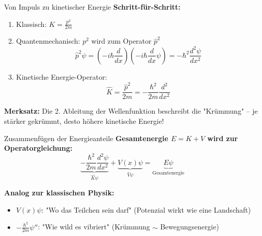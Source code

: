 \documentclass{beamer}
\begin{document}
    \begin{frame}{Von Impuls zu kinetischer Energie}
        \textbf{Schritt-für-Schritt:}
        \begin{enumerate}
            \item Klassisch: $K = \frac{p^2}{2m}$
            \item Quantenmechanisch: $p^2$ wird zum Operator $\hat{p}^2$
            \[
                \hat{p}^2\psi = (-i\hbar \frac{d}{dx})(-i\hbar \frac{d}{dx}\psi) = -\hbar^2 \frac{d^2\psi}{dx^2}
            \]
            \item Kinetische Energie-Operator:
            \[
                \hat{K} = \frac{\hat{p}^2}{2m} = -\frac{\hbar^2}{2m}\frac{d^2}{dx^2}
            \]
        \end{enumerate}
        \textbf{Merksatz:} Die 2.
        Ableitung der Wellenfunktion beschreibt die \alert{"Krümmung"} – je stärker gekrümmt, desto höhere kinetische Energie!
    \end{frame}

    \begin{frame}{Zusammenfügen der Energieanteile}
        \textbf{Gesamtenergie $E = K + V$ wird zur Operatorgleichung:}
        \[
            \underbrace{-\frac{\hbar^2}{2m}\frac{d^2\psi}{dx^2}}_{\hat{K}\psi} + \underbrace{V(x)\psi}_{\hat{V}\psi} = \underbrace{E\psi}_{\text{Gesamtenergie}}
        \]

        \textbf{Analog zur klassischen Physik:}
        \begin{itemize}
            \item $V(x)\psi$: "Wo das Teilchen sein darf" (Potenzial wirkt wie eine Landschaft)
            \item $-\frac{\hbar^2}{2m}\psi''$: "Wie wild es vibriert" (Krümmung $\sim$ Bewegungsenergie)
        \end{itemize}
    \end{frame}
\end{document}
